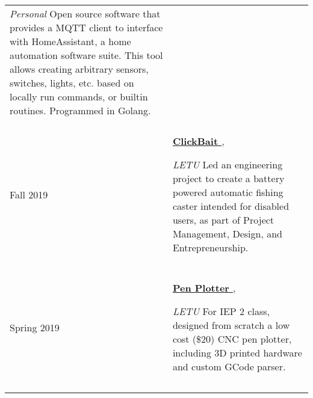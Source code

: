 \documentclass{article}
\begin{document}
\begin{tabularx}{\textwidth}{R{3.5cm} L}
	\textit{ Personal } \linebreak
	 Open source software that provides a MQTT client to interface with HomeAssistant, a home automation software suite. This tool allows creating arbitrary sensors, switches, lights, etc. based on locally run commands, or builtin routines. Programmed in Golang.
                 \\\\ \hfill
	  
	\textcolor{accent}{
		  
		 Fall 2019 
		  
	} &
	  
	\textbf{\href{ https://notmy.space/2020/03/clickbait/ }{ ClickBait }},
	  
	\textit{ LETU } \linebreak
	 Led an engineering project to create a battery powered automatic fishing caster intended for disabled users, as part of Project Management, Design, and Entrepreneurship.
                 \\\\ \hfill
	  
	\textcolor{accent}{
		  
		 Spring 2019 
		  
	} &
	  
	\textbf{\href{ https://notmy.space/2021/12/pen-plotter/ }{ Pen Plotter }},
	  
	\textit{ LETU } \linebreak
	 For IEP 2 class, designed from scratch a low cost (\$20) CNC pen plotter, including 3D printed hardware and custom GCode parser.
                 \\\\ \hfill
	  
\end{tabularx}
\end{document}
